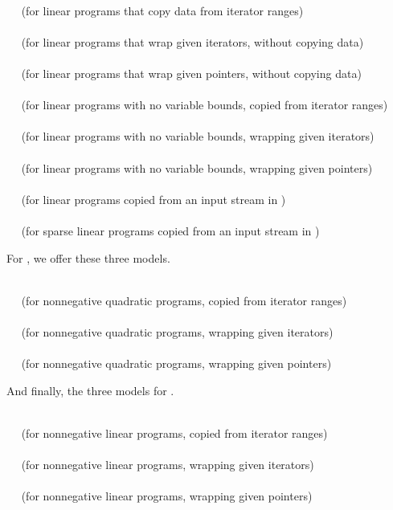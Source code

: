 \\
$\quad$ (for linear programs that copy data from iterator ranges) \\
\\
$\quad$ (for linear programs that wrap given iterators, without copying 
data) \\
\\
$\quad$ (for linear programs that wrap given pointers, without copying 
data) \\
\\
$\quad$ (for linear programs with no variable bounds, copied from iterator ranges)\\
\\
$\quad$ (for linear programs with no variable bounds, wrapping given 
iterators)\\
\\
$\quad$ (for linear programs with no variable bounds, wrapping given 
pointers)\\
\\ 
$\quad$ (for linear programs copied from an input stream in 
)\\
\\
$\quad$ (for sparse linear programs copied from an input stream in 
)

For , we offer these
three models.

\\
$\quad$ (for nonnegative quadratic programs, copied from iterator ranges)\\
\\
$\quad$ (for nonnegative quadratic programs, wrapping given iterators)\\
\\
$\quad$ (for nonnegative quadratic programs, wrapping given pointers)

And finally, the three models for .

\\
$\quad$ (for nonnegative linear programs, copied from iterator ranges)\\
\\
$\quad$ (for nonnegative linear programs, wrapping given iterators)\\
\\
$\quad$ (for nonnegative linear programs, wrapping given pointers)\\


